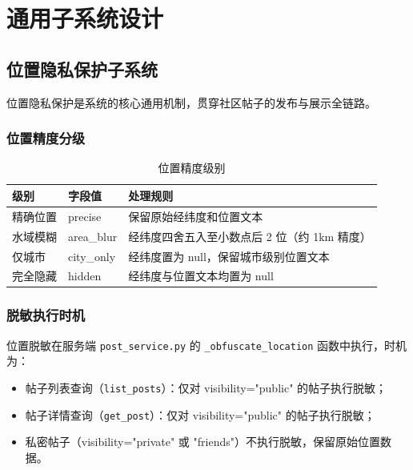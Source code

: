 \documentclass[12pt,a4paper]{ctexart}
\begin{document}
\newpage

\section{通用子系统设计}

\subsection{位置隐私保护子系统}

位置隐私保护是系统的核心通用机制，贯穿社区帖子的发布与展示全链路。

\subsubsection{位置精度分级}

\begin{table}[H]
  \centering
  \caption{位置精度级别}
  \label{tab:location-privacy}
  \begin{tabular}{p{2.5cm}p{3cm}p{6.5cm}}
    \toprule
    \textbf{级别} & \textbf{字段值} & \textbf{处理规则} \\
    \midrule
    精确位置 & precise & 保留原始经纬度和位置文本 \\
    水域模糊 & area\_blur & 经纬度四舍五入至小数点后 2 位（约 1km 精度） \\
    仅城市 & city\_only & 经纬度置为 null，保留城市级别位置文本 \\
    完全隐藏 & hidden & 经纬度与位置文本均置为 null \\
    \bottomrule
  \end{tabular}
\end{table}

\subsubsection{脱敏执行时机}

位置脱敏在服务端 \texttt{post\_service.py} 的 \texttt{\_obfuscate\_location} 函数中执行，时机为：
\begin{itemize}
  \item 帖子列表查询（\texttt{list\_posts}）：仅对 visibility="public" 的帖子执行脱敏；
  \item 帖子详情查询（\texttt{get\_post}）：仅对 visibility="public" 的帖子执行脱敏；
  \item 私密帖子（visibility="private" 或 "friends"）不执行脱敏，保留原始位置数据。
\end{itemize}
\end{document}
